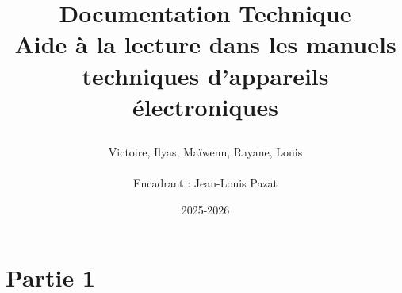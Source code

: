 \documentclass[a4paper,11pt]{article} %
\title{
\begin{center}
{\Huge \textbf{Documentation Technique}} \\[1cm]
{\textbf{} Aide à la lecture dans les manuels techniques d'appareils électroniques}
\end{center}
}
\author{Victoire, Ilyas, Ma\"iwenn, Rayane, Louis 
  \\ \\
  Encadrant : Jean-Louis Pazat}
\date{2025-2026}
\begin{document}
\maketitle

\section{Partie 1}
\end{document}

